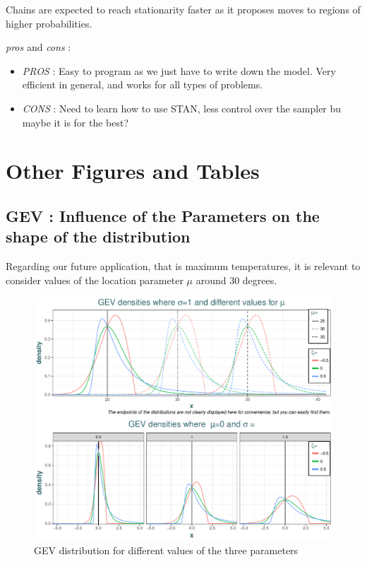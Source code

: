\documentclass[11pt,a4paper,openany ]{book}
\begin{document}
Chains are expected to reach stationarity faster as it proposes moves to regions of higher probabilities.


\emph{pros} and \emph{cons} : 

\begin{itemize}
	\item \emph{PROS} : Easy to program as we just have to write down the model. Very efficient in general, and works for all types of problems.
	\item \emph{CONS} : Need to learn how to use STAN, less control over the sampler bu maybe it is for the best?
\end{itemize}


\chapter{Other Figures and Tables}\label{app:fig}

\section{GEV : Influence of the Parameters on the shape of the distribution}

Regarding our future application, that is maximum temperatures, it is relevant to consider values of the location parameter $\mu$ around 30 degrees. 


\begin{figure}[!htb]
	\includegraphics[width=\linewidth]{gevdif.pdf}\caption{GEV distribution for different values of the three parameters }\label{fig:gevdif}
\end{figure}
\end{document}

